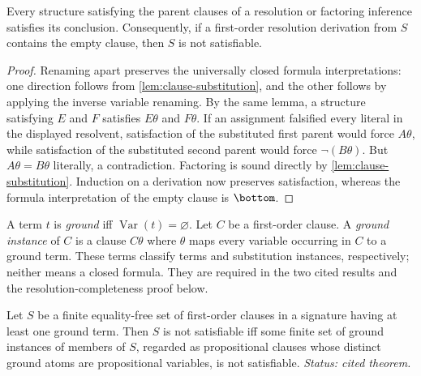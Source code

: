 \begin{theorem}
Every structure satisfying the parent clauses of a resolution or factoring
inference satisfies its conclusion.  Consequently, if a first-order
resolution derivation from \(S\) contains the empty clause, then \(S\) is not
satisfiable.
\end{theorem}
\begin{proof}
Renaming apart preserves the universally closed formula interpretations: one
direction follows from \cref{lem:clause-substitution}, and the other follows
by applying the inverse variable renaming.  By the same lemma, a structure
satisfying \(E\) and \(F\) satisfies \(E\theta\) and \(F\theta\).  If an
assignment falsified every literal in the displayed resolvent, satisfaction
of the substituted first parent would force \(A\theta\), while satisfaction
of the substituted second parent would force \(\neg(B\theta)\).  But
\(A\theta=B\theta\) literally, a contradiction.  Factoring is sound directly
by \cref{lem:clause-substitution}.  Induction on a derivation now preserves
satisfaction, whereas the formula interpretation of the empty clause is
\(\bottom\).
\end{proof}

\begin{definition}
A term \(t\) is \emph{ground} iff \(\operatorname{Var}(t)=\varnothing\).  Let
\(C\) be a first-order clause.  A \emph{ground instance} of \(C\) is a clause
\(C\theta\) where \(\theta\) maps every variable occurring in \(C\) to a
ground term.  These terms classify terms and substitution instances,
respectively; neither means a closed formula.  They are required in the two
cited results and the resolution-completeness proof below.
\end{definition}

\begin{theorem}
\label{thm:herbrand-clauses}
Let \(S\) be a finite equality-free set of first-order clauses in a signature
having at least one ground term.  Then \(S\) is not satisfiable iff some finite
set of ground instances of members of \(S\), regarded as propositional
clauses whose distinct ground atoms are propositional variables, is not
satisfiable.
\textit{Status: cited theorem.}
\end{theorem}

